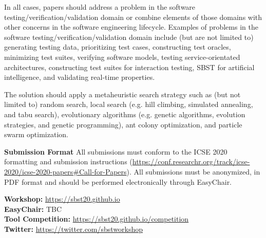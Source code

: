 \documentclass[10pt,conference]{IEEEtran}
\begin{document}
\smallskip \noindent In all cases, papers should address a problem in
the software testing/verification/validation domain or combine
elements of those domains with other concerns in the software
engineering lifecycle. Examples of problems in the software
testing/verification/validation domain include (but are not limited
to) generating testing data, prioritizing test cases, constructing
test oracles, minimizing test suites, verifying software models,
testing service-orientated architectures, constructing test suites for
interaction testing, SBST for artificial intelligence,
and validating real-time properties.

\smallskip \noindent The solution should apply a metaheuristic search
strategy such as (but not limited to) random search, local search
(e.g. hill climbing, simulated annealing, and tabu search),
evolutionary algorithms (e.g. genetic algorithms, evolution
strategies, and genetic programming), ant colony optimization, and
particle swarm optimization.

\smallskip\noindent\textbf{Submission Format}
\noindent All submissions must conform to the ICSE 2020 formatting and
submission instructions
(\url{https://conf.researchr.org/track/icse-2020/icse-2020-papers#Call-for-Papers}). All
submissions must be anonymized, in PDF format and should be performed
electronically through EasyChair.

\smallskip \noindent \textbf{Workshop:} \url{https://sbst20.github.io}\\
\textbf{EasyChair:} TBC\\ %
\textbf{Tool Competition:} \url{https://sbst20.github.io/competition}\\
\textbf{Twitter:} \url{https://twitter.com/sbstworkshop}

\end{document}
